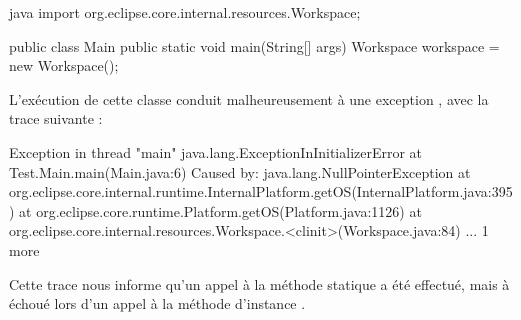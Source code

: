 \begin{imtaCode}{java}
import org.eclipse.core.internal.resources.Workspace;    

public class Main {
    public static void main(String[] args) {
        Workspace workspace = new Workspace();
    }
}
\end{imtaCode}

L'exécution de cette classe conduit malheureusement à une exception , avec la trace suivante :

\begin{imtaConsole}
Exception in thread "main" java.lang.ExceptionInInitializerError
	at Test.Main.main(Main.java:6)
Caused by: java.lang.NullPointerException
	at org.eclipse.core.internal.runtime.InternalPlatform.getOS(InternalPlatform.java:395)
	at org.eclipse.core.runtime.Platform.getOS(Platform.java:1126)
	at org.eclipse.core.internal.resources.Workspace.<clinit>(Workspace.java:84)
	... 1 more
\end{imtaConsole}

Cette trace nous informe qu'un appel à la méthode statique  a été effectué, mais à échoué lors d'un appel à la méthode d'instance %
.

